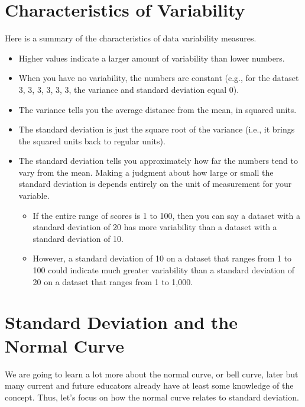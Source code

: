 \documentclass[
  letterpaper,
  DIV=11,
  numbers=noendperiod]{scrreprt}
\begin{document}
\section{Characteristics of
Variability}\label{characteristics-of-variability}

Here is a summary of the characteristics of data variability measures.

\begin{itemize}
\item
  Higher values indicate a larger amount of variability than lower
  numbers.
\item
  When you have no variability, the numbers are constant (e.g., for the
  dataset 3, 3, 3, 3, 3, 3, the variance and standard deviation equal
  0).
\item
  The variance tells you the average distance from the mean, in squared
  units.
\item
  The standard deviation is just the square root of the variance (i.e.,
  it brings the squared units back to regular units).
\item
  The standard deviation tells you approximately how far the numbers
  tend to vary from the mean. Making a judgment about how large or small
  the standard deviation is depends entirely on the unit of measurement
  for your variable.

  \begin{itemize}
  \item
    If the entire range of scores is 1 to 100, then you can say a
    dataset with a standard deviation of 20 has more variability than a
    dataset with a standard deviation of 10.
  \item
    However, a standard deviation of 10 on a dataset that ranges from 1
    to 100 could indicate much greater variability than a standard
    deviation of 20 on a dataset that ranges from 1 to 1,000.
  \end{itemize}
\end{itemize}

\section{Standard Deviation and the Normal
Curve}\label{standard-deviation-and-the-normal-curve}

We are going to learn a lot more about the normal curve, or bell curve,
later but many current and future educators already have at least some
knowledge of the concept. Thus, let's focus on how the normal curve
relates to standard deviation.
\end{document}
